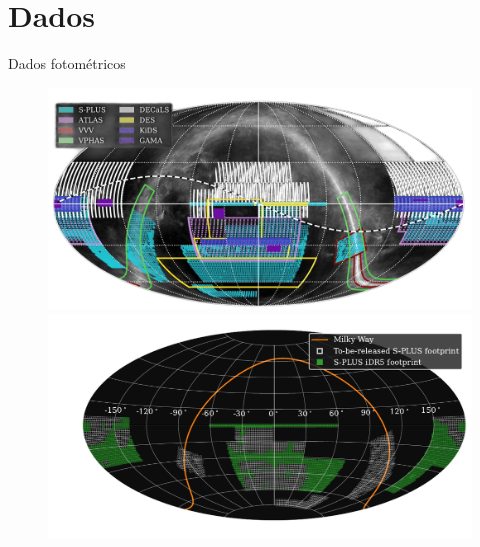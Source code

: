 \section{Dados}
\begin{frame}[c]{Dados fotométricos}
    \begin{figure}
        \centering
        \begin{minipage}{0.48\textwidth}
            \centering
            \includegraphics[width=\textwidth]{images/splus_survey_area.png}
        \end{minipage}
        \hfill
        \begin{minipage}{0.48\textwidth}
            \centering
            \includegraphics[width=\textwidth]{script/images/splus_footprint_idr5.pdf}
        \end{minipage}
    \end{figure}
\end{frame}

